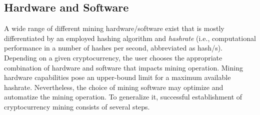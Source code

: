 \documentclass[preprint,12pt,3p]{elsarticle}
\begin{document}
\subsection{Hardware and Software}
\label{subsec32}
A wide range of different mining hardware/software exist that is mostly differentiated by an employed hashing algorithm and \textit{hashrate} (i.e., computational performance in a number of hashes per second, abbreviated as hash/s). Depending on a given cryptocurrency, the user chooses the appropriate combination of hardware and software that impacts mining operation. Mining hardware capabilities pose an upper-bound limit for a maximum available hashrate. Nevertheless, the choice of mining software may optimize and automatize the mining operation. To generalize it, successful establishment of cryptocurrency mining consists of several steps.
\end{document}
